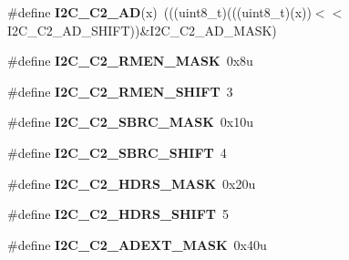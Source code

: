 \begin{DoxyCompactItemize}
\item 
\#define {\bfseries I2\+C\+\_\+\+C2\+\_\+\+AD}(x)~(((uint8\+\_\+t)(((uint8\+\_\+t)(x))$<$$<$I2\+C\+\_\+\+C2\+\_\+\+A\+D\+\_\+\+S\+H\+I\+FT))\&I2\+C\+\_\+\+C2\+\_\+\+A\+D\+\_\+\+M\+A\+SK)\hypertarget{group__I2C__Register__Masks_gaa19edf20551c0d4dc70b840c2c5b7e24}{}\label{group__I2C__Register__Masks_gaa19edf20551c0d4dc70b840c2c5b7e24}

\item 
\#define {\bfseries I2\+C\+\_\+\+C2\+\_\+\+R\+M\+E\+N\+\_\+\+M\+A\+SK}~0x8u\hypertarget{group__I2C__Register__Masks_ga70911373d5619a4d8376777446085856}{}\label{group__I2C__Register__Masks_ga70911373d5619a4d8376777446085856}

\item 
\#define {\bfseries I2\+C\+\_\+\+C2\+\_\+\+R\+M\+E\+N\+\_\+\+S\+H\+I\+FT}~3\hypertarget{group__I2C__Register__Masks_ga802a10e2d279895ec0230b4701b1a4bf}{}\label{group__I2C__Register__Masks_ga802a10e2d279895ec0230b4701b1a4bf}

\item 
\#define {\bfseries I2\+C\+\_\+\+C2\+\_\+\+S\+B\+R\+C\+\_\+\+M\+A\+SK}~0x10u\hypertarget{group__I2C__Register__Masks_gad5acb46182264a92f1f7ca818146d44e}{}\label{group__I2C__Register__Masks_gad5acb46182264a92f1f7ca818146d44e}

\item 
\#define {\bfseries I2\+C\+\_\+\+C2\+\_\+\+S\+B\+R\+C\+\_\+\+S\+H\+I\+FT}~4\hypertarget{group__I2C__Register__Masks_ga620079dc18e7ce504b6092503a10d2ae}{}\label{group__I2C__Register__Masks_ga620079dc18e7ce504b6092503a10d2ae}

\item 
\#define {\bfseries I2\+C\+\_\+\+C2\+\_\+\+H\+D\+R\+S\+\_\+\+M\+A\+SK}~0x20u\hypertarget{group__I2C__Register__Masks_gaa36c867ead9ecee381f4a6f1f75ccc70}{}\label{group__I2C__Register__Masks_gaa36c867ead9ecee381f4a6f1f75ccc70}

\item 
\#define {\bfseries I2\+C\+\_\+\+C2\+\_\+\+H\+D\+R\+S\+\_\+\+S\+H\+I\+FT}~5\hypertarget{group__I2C__Register__Masks_ga0d2a8c7a7fb308cf052fc122c1af92c5}{}\label{group__I2C__Register__Masks_ga0d2a8c7a7fb308cf052fc122c1af92c5}

\item 
\#define {\bfseries I2\+C\+\_\+\+C2\+\_\+\+A\+D\+E\+X\+T\+\_\+\+M\+A\+SK}~0x40u\hypertarget{group__I2C__Register__Masks_ga331301810a6ac65f43e66b78bbde4c91}{}\label{group__I2C__Register__Masks_ga331301810a6ac65f43e66b78bbde4c91}


\end{DoxyCompactItemize}
